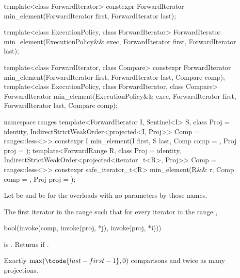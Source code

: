 %
\begin{itemdecl}
template<class ForwardIterator>
  constexpr ForwardIterator min_element(ForwardIterator first, ForwardIterator last);

template<class ExecutionPolicy, class ForwardIterator>
  ForwardIterator min_element(ExecutionPolicy&& exec,
                              ForwardIterator first, ForwardIterator last);

template<class ForwardIterator, class Compare>
  constexpr ForwardIterator min_element(ForwardIterator first, ForwardIterator last,
                                        Compare comp);
template<class ExecutionPolicy, class ForwardIterator, class Compare>
  ForwardIterator min_element(ExecutionPolicy&& exec,
                              ForwardIterator first, ForwardIterator last,
                              Compare comp);

namespace ranges {
  template<ForwardIterator I, Sentinel<I> S, class Proj = identity,
           IndirectStrictWeakOrder<projected<I, Proj>> Comp = ranges::less<>>
    constexpr I min_element(I first, S last, Comp comp = {}, Proj proj = {});
  template<ForwardRange R, class Proj = identity,
           IndirectStrictWeakOrder<projected<iterator_t<R>, Proj>> Comp = ranges::less<>>
    constexpr safe_iterator_t<R>
      min_element(R&& r, Comp comp = {}, Proj proj = {});
}
\end{itemdecl}

\begin{itemdescr}
\pnum
Let  be 
and  be 
for the overloads with no parameters by those names.

\pnum
\returns
The first iterator  in the range 
such that for every iterator  in the range ,
\begin{codeblock}
bool(invoke(comp, invoke(proj, *j), invoke(proj, *i)))
\end{codeblock}
is .
Returns  if .

\pnum
\complexity
Exactly $\max(\tcode{last - first - 1}, 0)$ comparisons and
twice as many projections.
\end{itemdescr}

